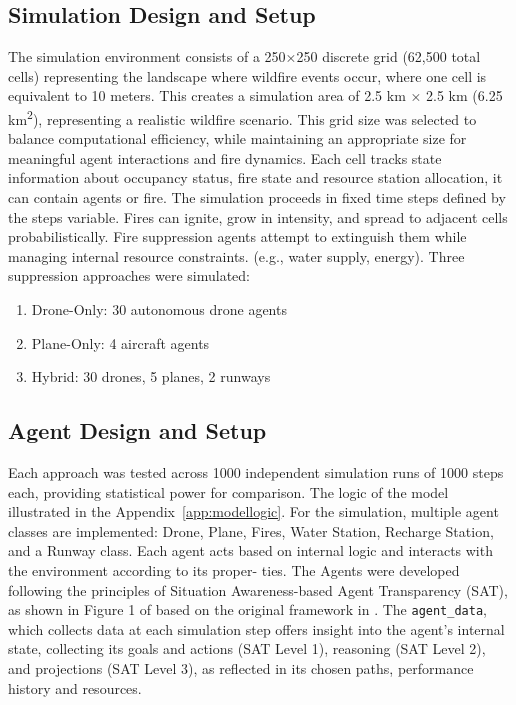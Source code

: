 \documentclass[twoside]{article}
\begin{document}
\subsection{Simulation Design and Setup}
The simulation environment consists of a 250×250 discrete grid (62,500 total cells) representing the landscape where wildfire events occur, where one cell is equivalent to 10 meters. This creates a simulation area of 2.5 km × 2.5 km (6.25 km\textsuperscript{2}), representing a realistic wildfire scenario. This grid size was selected to balance computational efficiency, while maintaining an appropriate size for meaningful agent interactions and fire dynamics. Each cell tracks state information about occupancy status, fire state and resource station allocation, it can contain agents or fire.
The simulation proceeds in fixed time steps defined by the steps variable. Fires can ignite, grow in intensity, and spread to adjacent cells probabilistically. Fire suppression agents attempt to extinguish them while managing internal
resource constraints. (e.g., water supply, energy). 
Three suppression approaches were simulated:
\begin{enumerate}
  \item Drone-Only: 30 autonomous drone agents
  \item Plane-Only: 4 aircraft agents 
  \item Hybrid: 30 drones, 5 planes, 2 runways
\end{enumerate}

\subsection{Agent Design and Setup}

Each approach was tested across 1000 independent simulation runs of 1000 steps each, providing statistical power for comparison. The logic of the model illustrated in the Appendix~\ref{app:modellogic}.
For the simulation, multiple agent classes are implemented: Drone, Plane, Fires, Water Station, Recharge Station, and a Runway class. Each agent acts based on internal logic and interacts with the environment according to its proper-
ties. The Agents were developed following the principles of Situation Awareness-based
Agent Transparency (SAT), as shown in Figure 1 of \citep{chenSituationAwarenessbasedAgent2018} based on the
original framework in \citet*{SAT_first}. The \texttt{agent\_data}, which collects data at each simulation step offers insight into the agent’s internal state, collecting its goals and actions (SAT Level 1), reasoning (SAT Level 2), and projections (SAT Level 3), as reflected in its chosen paths, performance history and resources.
\end{document}
